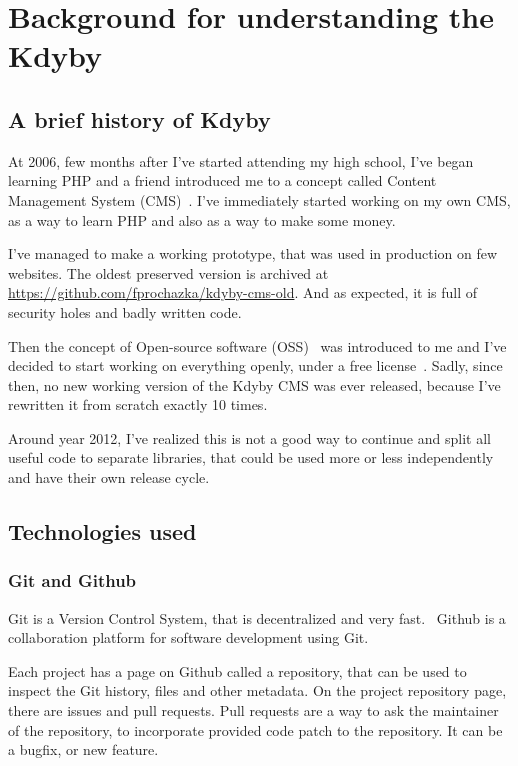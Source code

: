 \chapter{Background for understanding the Kdyby}

\section{A brief history of Kdyby} \label{sec:theory:kdyby-history}

At 2006, few months after I've started attending my high school, I've began learning PHP and a friend introduced me to a concept called Content Management System (CMS)~\cite{wiki:cms}. I've immediately started working on my own CMS, as a way to learn PHP and also as a way to make some money.

I've managed to make a working prototype, that was used in production on few websites. The oldest preserved version is archived at \url{https://github.com/fprochazka/kdyby-cms-old}. And as expected, it is full of security holes and badly written code.

Then the concept of Open-source software (OSS)~\cite{wiki:oss} was introduced to me and I've decided to start working on everything openly, under a free license~\cite{wiki:fsl}. Sadly, since then, no new working version of the Kdyby CMS was ever released, because I've rewritten it from scratch exactly 10 times.

Around year 2012, I've realized this is not a good way to continue and split all useful code to separate libraries, that could be used more or less independently and have their own release cycle.

\section{Technologies used}

\tocless\subsection{Git and Github} \label{sec:theory:git}

Git is a Version Control System, that is decentralized and very fast.~\cite{progit} Github is a collaboration platform for software development using Git.

Each project has a page on Github called a repository, that can be used to inspect the Git history, files and other metadata. On the project repository page, there are issues and pull requests. Pull requests are a way to ask the maintainer of the repository, to incorporate provided code patch to the repository. It can be a bugfix, or new feature.

